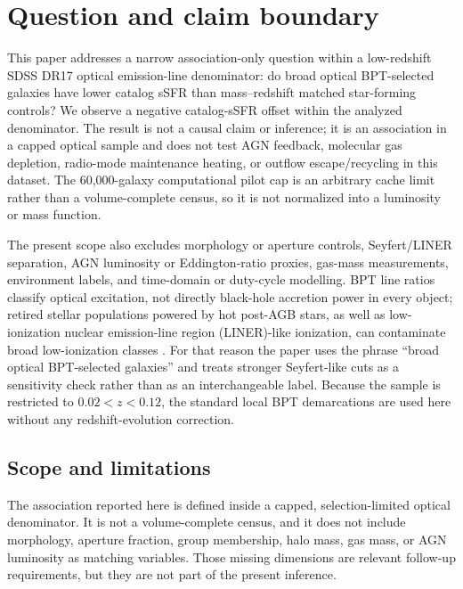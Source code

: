 \documentclass[twocolumn]{aastex631}
\begin{document}
\section{Question and claim boundary}
This paper addresses a narrow association-only question within a low-redshift SDSS DR17 optical emission-line denominator: do broad optical BPT-selected galaxies have lower catalog sSFR than mass--redshift matched star-forming controls? We observe a negative catalog-sSFR offset within the analyzed denominator. The result is not a causal claim or inference; it is an association in a capped optical sample and does not test AGN feedback, molecular gas depletion, radio-mode maintenance heating, or outflow escape/recycling in this dataset.
The 60,000-galaxy computational pilot cap is an arbitrary cache limit rather than a volume-complete census, so it is not normalized into a luminosity or mass function.


The present scope also excludes morphology or aperture controls, Seyfert/LINER separation, AGN luminosity or Eddington-ratio proxies, gas-mass measurements, environment labels, and time-domain or duty-cycle modelling. BPT line ratios classify optical excitation, not directly black-hole accretion power in every object; retired stellar populations powered by hot post-AGB stars, as well as low-ionization nuclear emission-line region (LINER)-like ionization, can contaminate broad low-ionization classes \citep{cidfernandes2011,stasinska2008,stasinska2015}. For that reason the paper uses the phrase ``broad optical BPT-selected galaxies'' and treats stronger Seyfert-like cuts as a sensitivity check rather than as an interchangeable label. Because the sample is restricted to $0.02<z<0.12$, the standard local BPT demarcations are used here without any redshift-evolution correction.

\subsection{Scope and limitations}
The association reported here is defined inside a capped, selection-limited optical denominator. It is not a volume-complete census, and it does not include morphology, aperture fraction, group membership, halo mass, gas mass, or AGN luminosity as matching variables. Those missing dimensions are relevant follow-up requirements, but they are not part of the present inference.
\end{document}
